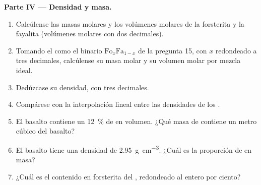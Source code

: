 \begin{problem}
\medskip
\noindent\textbf{Parte IV --- Densidad y masa.}
\begin{enumerate}[resume]
  \item Calcúlense las masas molares y los volúmenes molares de la forsterita y la fayalita (volúmenes molares con
        dos decimales).
  \item Tomando el  como el binario $\mathrm{Fo}_x\mathrm{Fa}_{1-x}$ de la pregunta 15, con $x$ redondeado a
        tres decimales, calcúlense su masa molar y su volumen molar por mezcla ideal.
  \item Dedúzcase su densidad, con tres decimales.
  \item Compárese con la interpolación lineal entre las densidades de los .
  \item El basalto contiene un \qty{12}{\percent} de  en volumen. ¿Qué masa de  contiene un metro
        cúbico del basalto?
  \item El basalto tiene una densidad de \qty{2.95}{g.cm^{-3}}. ¿Cuál es la proporción de  en masa?
  \item ¿Cuál es el contenido en forsterita del , redondeado al entero por ciento?
\end{enumerate}
\end{problem}
